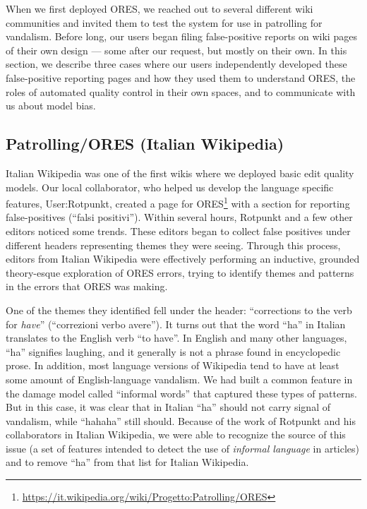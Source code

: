 When we first deployed ORES, we reached out to several different wiki communities and invited them to test the system for use in patrolling for vandalism.  Before long, our users began filing false-positive reports on wiki pages of their own design --- some after our request, but mostly on their own.  In this section, we describe three cases where our users independently developed these false-positive reporting pages and how they used them to understand ORES, the roles of automated quality control in their own spaces, and to communicate with us about model bias.

\subsection{Patrolling/ORES (Italian Wikipedia)}
Italian Wikipedia was one of the first wikis where we deployed basic edit quality models.  Our local collaborator, who helped us develop the language specific features, User:Rotpunkt, created a page for ORES\footnote{\url{https://it.wikipedia.org/wiki/Progetto:Patrolling/ORES}} with a section for reporting false-positives (``falsi positivi'').  Within several hours, Rotpunkt and a few other editors noticed some trends.  These editors began to collect false positives under different headers representing themes they were seeing.  Through this process, editors from Italian Wikipedia were effectively performing an inductive, grounded theory-esque exploration of ORES errors, trying to identify themes and patterns in the errors that ORES was making.

One of the themes they identified fell under the header: ``corrections to the verb for \emph{have}'' (``correzioni verbo avere'').  It turns out that the word ``ha'' in Italian translates to the English verb ``to have''.  In English and many other languages, ``ha'' signifies laughing, and it generally is not a phrase found in encyclopedic prose. In addition, most language versions of Wikipedia tend to have at least some amount of English-language vandalism.  We had built a common feature in the damage model called ``informal words'' that captured these types of patterns.  But in this case, it was clear that in Italian ``ha'' should not carry signal of vandalism, while ``hahaha'' still should. Because of the work of Rotpunkt and his collaborators in Italian Wikipedia, we were able to recognize the source of this issue (a set of features intended to detect the use of \emph{informal language} in articles) and to remove ``ha'' from that list for Italian Wikipedia.

